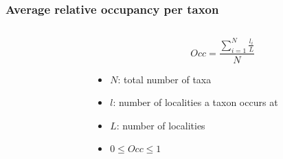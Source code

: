 \documentclass{beamer} \usepackage{amsmath,amsthm}
\begin{document}
\begin{frame}
  \frametitle{Average relative occupancy per taxon}

  \begin{columns}
    \begin{column}{0.5\textwidth}
    \end{column}
    \begin{column}{0.5\textwidth}
      \[
        Occ = \frac{\sum_{i = 1}^{N} \frac{l_{i}}{L}}{N}
      \]

      \begin{itemize}
        \item \(N\): total number of taxa
        \item \(l\): number of localities a taxon occurs at
        \item \(L\): number of localities
        \item \(0 \leq Occ \leq 1\)
      \end{itemize}
    \end{column}
  \end{columns}
\end{frame}
\end{document}

